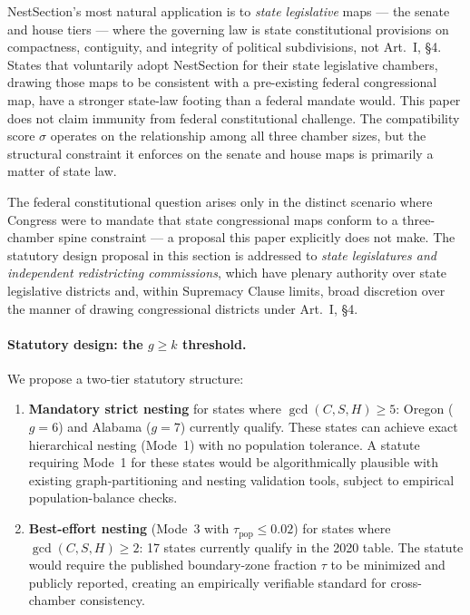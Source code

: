 NestSection's most natural application is to \emph{state legislative} maps
--- the senate and house tiers --- where the governing law is state
constitutional provisions on compactness, contiguity, and integrity of
political subdivisions, not Art.\ I, \S4.  States that voluntarily adopt
NestSection for their state legislative chambers, drawing those maps to be
consistent with a pre-existing federal congressional map, have a stronger
state-law footing than a federal mandate would.  This paper does not claim
immunity from federal constitutional challenge.  The compatibility score
$\sigma$ operates on the relationship among all three chamber sizes, but the
structural constraint it enforces on the senate and house maps is primarily a
matter of state law.

The federal constitutional question arises only in the distinct scenario where
Congress were to mandate that state congressional maps conform to a
three-chamber spine constraint --- a proposal this paper explicitly does not
make.  The statutory design proposal in this section is addressed to
\emph{state legislatures and independent redistricting commissions}, which
have plenary authority over state legislative districts and, within Supremacy
Clause limits, broad discretion over the manner of drawing congressional
districts under Art.\ I, \S4.

\paragraph{Statutory design: the $g \geq k$ threshold.}
We propose a two-tier statutory structure:
\begin{enumerate}
  \item \textbf{Mandatory strict nesting} for states where $\gcd(C,S,H) \geq 5$:
        Oregon ($g=6$) and Alabama ($g=7$) currently qualify.  These states
        can achieve exact hierarchical nesting (Mode~1) with no population
        tolerance.  A statute requiring Mode~1 for these states would be
        algorithmically plausible with existing graph-partitioning and nesting
        validation tools, subject to empirical population-balance checks.
  \item \textbf{Best-effort nesting} (Mode~3 with $\tau_\text{pop} \leq 0.02$)
        for states where $\gcd(C,S,H) \geq 2$: 17 states currently qualify in
        the 2020 table.
        The statute would require the published boundary-zone fraction $\tau$ to
        be minimized and publicly reported, creating an empirically verifiable
        standard for cross-chamber consistency.
\end{enumerate}


